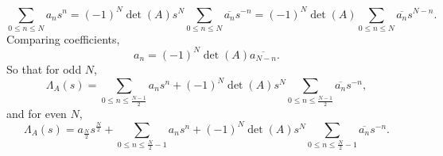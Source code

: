 \documentclass[12pt]{book}
\theoremstyle{definition}\newframedtheorem{method}{Method}
\renewcommand{\L}{\Lambda}
\newcommand{\<}{\langle}
\renewcommand{\>}{\rangle}
\newcommand{\conj}{\overline}
\begin{document}
      \[
        \sum_{0 \le n \le N}a_{n}s^{n} = (-1)^{N}\det(A)s^{N}\sum_{0 \le n \le N}\conj{a_{n}}s^{-n} = (-1)^{N}\det(A)\sum_{0 \le n \le N}\conj{a_{n}}s^{N-n}.
      \]
      Comparing coefficients,
      \[
        a_{n} = (-1)^{N}\det(A)\conj{a_{N-n}}.
      \]
      So that for odd $N$,
      \[
        \L_{A}(s) = \sum_{0 \le n \le \frac{N-1}{2}}a_{n}s^{n}+(-1)^{N}\det(A)s^{N}\sum_{0 \le n \le \frac{N-1}{2}}\conj{a_{n}}s^{-n},
      \]
      and for even $N$,
      \[
        \L_{A}(s) = a_{\frac{N}{2}}s^{\frac{N}{2}}+\sum_{0 \le n \le \frac{N}{2}-1}a_{n}s^{n}+(-1)^{N}\det(A)s^{N}\sum_{0 \le n \le \frac{N}{2}-1}\conj{a_{n}}s^{-n}.
      \]
\appendix
\printindex


\end{document}
